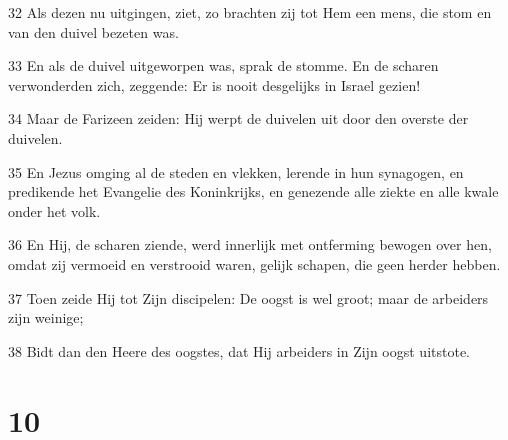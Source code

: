 \par 32 Als dezen nu uitgingen, ziet, zo brachten zij tot Hem een mens, die stom en van den duivel bezeten was.
\par 33 En als de duivel uitgeworpen was, sprak de stomme. En de scharen verwonderden zich, zeggende: Er is nooit desgelijks in Israel gezien!
\par 34 Maar de Farizeen zeiden: Hij werpt de duivelen uit door den overste der duivelen.
\par 35 En Jezus omging al de steden en vlekken, lerende in hun synagogen, en predikende het Evangelie des Koninkrijks, en genezende alle ziekte en alle kwale onder het volk.
\par 36 En Hij, de scharen ziende, werd innerlijk met ontferming bewogen over hen, omdat zij vermoeid en verstrooid waren, gelijk schapen, die geen herder hebben.
\par 37 Toen zeide Hij tot Zijn discipelen: De oogst is wel groot; maar de arbeiders zijn weinige;
\par 38 Bidt dan den Heere des oogstes, dat Hij arbeiders in Zijn oogst uitstote.

\chapter{10}

